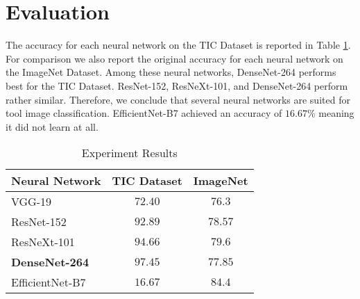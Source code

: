\documentclass[a4paper, 10pt, journal]{wissarbIEEE}
\begin{document}
\section{Evaluation}
\label{sec:eval}
The accuracy for each neural network on the TIC Dataset is reported in Table \ref{tab:acc}. For comparison we also report the original accuracy for each  neural network on the ImageNet Dataset.
Among these neural networks, DenseNet-264 performs best for the {TIC Dataset}. ResNet-152, ResNeXt-101, and DenseNet-264 perform rather similar. Therefore, we conclude that several neural networks are suited for tool image classification.  
EfficientNet-B7 achieved an accuracy of $16.67\%$ meaning it did not learn at all.
\begin{table}[h]
\caption{Experiment Results} \label{tab:acc}
	\begin{tabularx}{0.48\textwidth}{Xcc}
		\toprule 
		\textbf{Neural Network} & \textbf{TIC Dataset} & \textbf{ImageNet} \\\midrule
		VGG-19 & $72.40$ & $76.3$ \cite{Simonyan.2014}\\
		ResNet-152 & $92.89$ & $78.57$ \cite{He.2016}\\
		ResNeXt-101 & $94.66$ & $79.6$\cite{Xie.2017} \\
		\textbf{DenseNet-264} & $\mathbf{97.45}$ & $77.85$ \cite{Huang.2017}\\
		EfficientNet-B7 & $16.67$ & $84.4$ \cite{Tan.2019}\\
		\bottomrule
	\end{tabularx}
\end{table}
\end{document}
